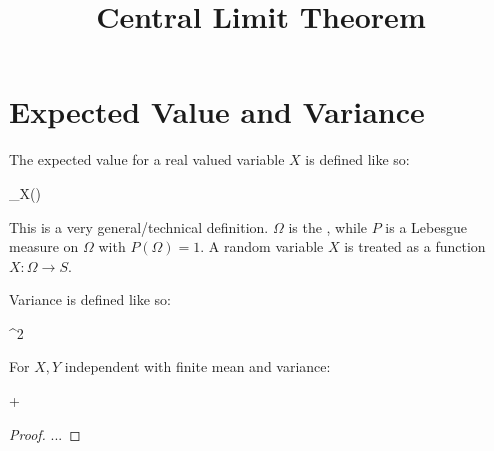 \documentclass[11pt, oneside]{amsart}
\begin{document}
\title{Central Limit Theorem}
\maketitle

\section{Expected Value and Variance}

\begin{definition}
  The expected value for a real valued variable $X$ is defined like so:

  \begin{nedqn}
  \eqcol
    \int_\Omega X(\omega) 
  \end{nedqn}
\end{definition}

\begin{remark}
  This is a very general/technical definition. $\Omega$ is the
  , while $P$ is a Lebesgue measure on $\Omega$
  with $P(\Omega) = 1$. A random variable $X$ is treated as a function
  $X: \Omega \to S$.
\end{remark}

\begin{definition}
  Variance is defined like so:

  \begin{nedqn}
  \eqcol
  \end{nedqn}
\end{definition}

\begin{proposition}
  \begin{nedqn}
  \eqcol
    \alpha^2 
  \end{nedqn}
\end{proposition}

\begin{proposition}
  For $X, Y$ independent with finite mean and variance:

  \begin{nedqn}
  \eqcol
     + 
  \end{nedqn}
\end{proposition}

\begin{proof}
  ...
\end{proof}
\end{document}
